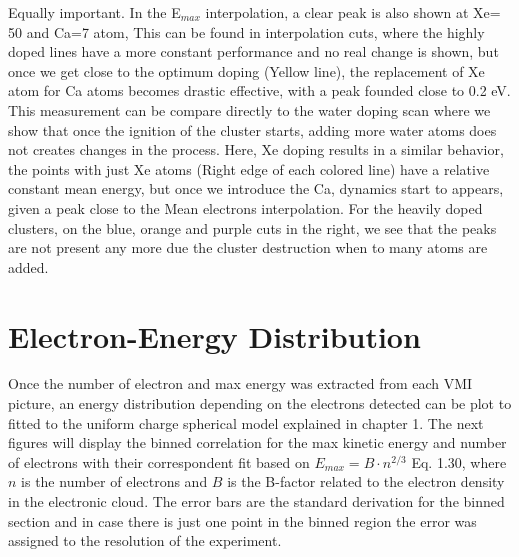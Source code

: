 Equally important. In the E$_{max}$ interpolation, a clear peak is also shown at Xe= 50 and Ca=7 atom,  This can be found in interpolation cuts, where the highly doped lines have a more constant performance and no real change is shown, but once we get close to the optimum doping (Yellow line), the replacement of Xe atom for Ca atoms becomes drastic effective, with a peak  founded close to 0.2 eV.  This measurement can be compare directly to the water doping scan where we show that once the ignition of the cluster starts, adding more water atoms does not creates changes in the process. Here, Xe doping results in a similar behavior, the points with just Xe atoms (Right edge of each colored line) have a relative constant mean energy, but once we introduce the Ca, dynamics start to appears, given a peak close to the Mean electrons interpolation. For the heavily doped clusters, on the blue, orange and purple cuts in the right, we see that the peaks are not present any more due the cluster destruction when to many atoms are added.



\section{Electron-Energy Distribution}

Once the number of electron and max energy was extracted from each VMI picture, an energy distribution depending on the electrons detected can be plot to fitted to the uniform charge spherical model explained in chapter 1. The next figures will display the binned correlation for the max kinetic energy and number of electrons with their correspondent fit based on $E_{max}=B\cdot n^{2/3}$ Eq. 1.30, where $n$ is the number of electrons  and $B$ is the B-factor related to the electron density in the electronic cloud. The error bars are the standard derivation for the binned section and in case there is just one point in the binned region the error was assigned to the resolution of the experiment.


